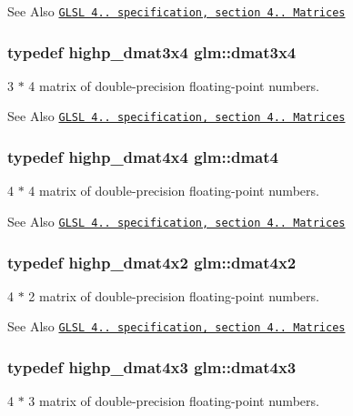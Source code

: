 \begin{DoxySeeAlso}{See Also}
\href{http://www.opengl.org/registry/doc/GLSLangSpec.4.20.8.pdf}{\tt G\-L\-S\-L 4.. specification, section 4.. Matrices} 
\end{DoxySeeAlso}
\hypertarget{group__core__types_ga19e745a83cba85f57afa1232276dcc96}{
\subsubsection[{dmat3x4}]{\setlength{\rightskip}{0pt plus 5cm}typedef highp\-\_\-dmat3x4 {\bf glm\-::dmat3x4}}}\label{group__core__types_ga19e745a83cba85f57afa1232276dcc96}
3 $\ast$ 4 matrix of double-\/precision floating-\/point numbers.

\begin{DoxySeeAlso}{See Also}
\href{http://www.opengl.org/registry/doc/GLSLangSpec.4.20.8.pdf}{\tt G\-L\-S\-L 4.. specification, section 4.. Matrices} 
\end{DoxySeeAlso}
\hypertarget{group__core__types_ga7f7c1300ebfd19d573e9deb1e8758b54}{
\subsubsection[{dmat4}]{\setlength{\rightskip}{0pt plus 5cm}typedef highp\-\_\-dmat4x4 {\bf glm\-::dmat4}}}\label{group__core__types_ga7f7c1300ebfd19d573e9deb1e8758b54}
4 $\ast$ 4 matrix of double-\/precision floating-\/point numbers.

\begin{DoxySeeAlso}{See Also}
\href{http://www.opengl.org/registry/doc/GLSLangSpec.4.20.8.pdf}{\tt G\-L\-S\-L 4.. specification, section 4.. Matrices} 
\end{DoxySeeAlso}
\hypertarget{group__core__types_gab3d51ce41e6f0aa267d3e185cee09c44}{
\subsubsection[{dmat4x2}]{\setlength{\rightskip}{0pt plus 5cm}typedef highp\-\_\-dmat4x2 {\bf glm\-::dmat4x2}}}\label{group__core__types_gab3d51ce41e6f0aa267d3e185cee09c44}
4 $\ast$ 2 matrix of double-\/precision floating-\/point numbers.

\begin{DoxySeeAlso}{See Also}
\href{http://www.opengl.org/registry/doc/GLSLangSpec.4.20.8.pdf}{\tt G\-L\-S\-L 4.. specification, section 4.. Matrices} 
\end{DoxySeeAlso}
\hypertarget{group__core__types_gaa4a157ac183c5bd5dcbd555a94b1b505}{
\subsubsection[{dmat4x3}]{\setlength{\rightskip}{0pt plus 5cm}typedef highp\-\_\-dmat4x3 {\bf glm\-::dmat4x3}}}\label{group__core__types_gaa4a157ac183c5bd5dcbd555a94b1b505}
4 $\ast$ 3 matrix of double-\/precision floating-\/point numbers.


